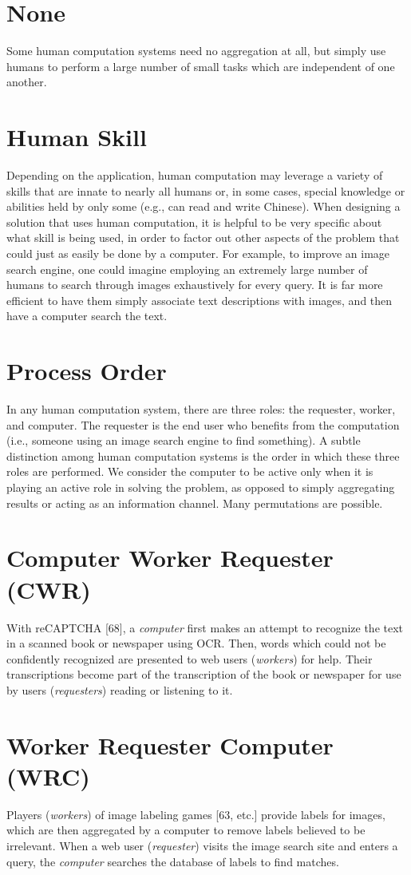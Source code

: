 \documentclass{acm_proc_article-sp}
\newcommand{\carrow}{\ding{225}}
\begin{document}
\section*{None}
Some human computation systems need no aggregation at all, but simply use humans to perform a large number of small tasks which are independent of one another.
\section*{Human Skill} 
Depending on the application, human computation may leverage a variety of skills that are innate to nearly all humans or, in some cases, special knowledge or abilities held by only some (e.g., can read and write Chinese). When designing a solution that uses human computation, it is helpful to be very specific about what skill is being used, in order to factor out other aspects of the problem that could just as easily be done by a computer. For example, to improve an image search engine, one could imagine employing an extremely large number of humans to search through images exhaustively for every query. It is far more efficient to have them simply associate text descriptions with images, and then have a computer search the text.
\section*{Process Order}
In any human computation system, there are three roles: the requester, worker, and computer. The requester is the end user who benefits from the computation (i.e., someone using an image search engine to find something). A subtle distinction among human computation systems is the order in which these three roles are performed. We consider the computer to be active only when it is playing an active role in solving the problem, as opposed to simply aggregating results or acting as an information channel. Many permutations are possible.
\section*{Computer \carrow Worker \carrow Requester (CWR)}
With reCAPTCHA [68], a \textit{computer} first makes an attempt to recognize the text in a scanned book or newspaper using OCR. Then, words which could not be confidently recognized are presented to web users (\textit{workers}) for help. Their transcriptions become part of the transcription of the book or newspaper for use by users (\textit{requesters}) reading or listening to it.
\section*{Worker \carrow Requester \carrow Computer (WRC)}
Players (\textit{workers}) of image labeling games [63, etc.] provide labels for images, which are then aggregated by a computer to remove labels believed to be irrelevant. When a web user (\textit{requester}) visits the image search site and enters a query, the \textit{computer} searches the database of labels to find matches.
\end{document}
